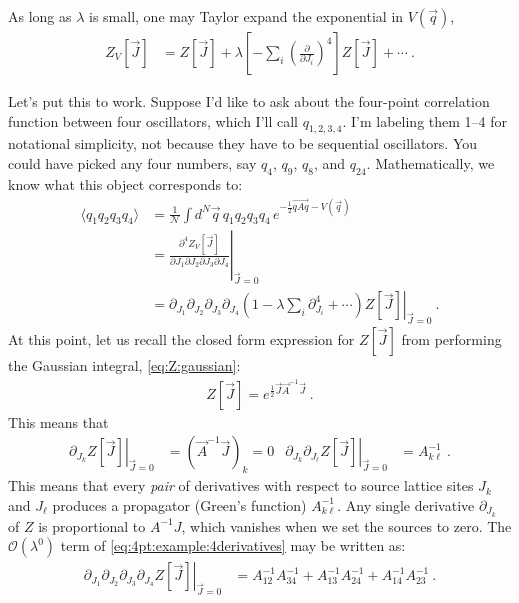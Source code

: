 As long as $\lambda$ is small, one may Taylor expand the exponential in $V(\vec{q})$,
\begin{align}
	Z_V[\vec{J}] &= Z[\vec{J}] + \lambda\left[-\sum_i \left(\frac{\partial}{\partial J_i}\right)^4\right] Z[\vec{J}] + \cdots \ .
\end{align}

Let's put this to work. Suppose I'd like to ask about the four-point correlation function between four oscillators, which I'll call $q_{1,2,3,4}$. I'm labeling them 1--4 for notational simplicity, not because they have to be sequential oscillators. You could have picked any four numbers, say $q_4$, $q_9$, $q_{8}$, and $q_{24}$. Mathematically, we know what this object corresponds to:
\begin{align}
	\langle q_1q_2q_3q_4 \rangle
	&= 
	\frac{1}{\mathcal N}
	\int d^N\vec{q} \, 
	q_1q_2q_3q_4 \,
	e^{-\frac{1}{2}\vec{qAq} - V(\vec{q})}
	\\
	&=
	\left.\frac{\partial^4 Z_V[\vec{J}]}{\partial J_1\partial J_2\partial J_3 \partial J_4}\right|_{\vec{J}=0}
	\\
	&= \left.\partial_{J_1}\partial_{J_2}\partial_{J_3}\partial_{J_4}
	\left(1 - \lambda\sum_i \partial_{J_i}^4 + \cdots\right) Z[\vec{J}] 
	\right|_{\vec{J}=0}
	\ .
	\label{eq:4pt:example:4derivatives}
\end{align}
At this point, let us recall the closed form expression for $Z[\vec{J}]$ from performing the Gaussian integral, \eqref{eq:Z:gaussian}:
\begin{align}
	Z[\vec{J}]
	=
	e^{\frac{1}{2}\vec{J}\vec{A}^{-1}\vec{J}} \ .
\end{align}
This means that
\begin{align}
	\left.
	\partial_{J_k}Z[\vec{J}]
	\right|_{\vec{J}=0}
	&= 
	\left(\vec{A}^{-1}\vec{J}\right)_k
	= 0
	&
	\left.
	\partial_{J_k}\partial_{J_\ell}Z[\vec{J}]
	\right|_{\vec{J}=0}
	&= 
	A^{-1}_{k\ell}
	\ .
\end{align}
This means that every \emph{pair} of derivatives with respect to source lattice sites $J_k$ and $J_\ell$ produces a propagator (Green's function) $A^{-1}_{k\ell}$. Any single derivative $\partial_{J_k}$ of $Z$ is proportional to $A^{-1}J$, which vanishes when we set the sources to zero. The $\mathcal O(\lambda^0)$ term of \eqref{eq:4pt:example:4derivatives} may be written as:
\begin{align}
	\left.
	\partial_{J_1}\partial_{J_2}\partial_{J_3}\partial_{J_4}
	Z[\vec{J}] 
	\right|_{\vec{J}=0}
	&=
	A^{-1}_{12}A^{-1}_{34} + A^{-1}_{13}A^{-1}_{24} + A^{-1}_{14}A^{-1}_{23} \ .
	\label{eq:4pt:ex:4der:leading:props}
\end{align}
